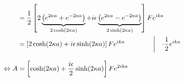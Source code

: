 {\begin{align}
              & = \frac{1}{2}\left[
                     2 
                     \underbrace{\left(e^{2\kappa a}+e^{-2\kappa a}\right)}
                     _{2\cosh(2\kappa a)}
                     +i\epsilon
                     \underbrace{\left(e^{2\kappa a}-e^{-2\kappa a}\right)}
                    _{2\sinh(2\kappa a)}\right]
                     Fe^{ika} \notag \\
              & = \left[2\cosh(2\kappa a) +i\epsilon\sinh(2\kappa a)\right]
                     Fe^{ika} \qquad \qquad \left|\quad \cdot
                       \frac{1}{2}e^{ika}\right.\notag\\[2ex]
\Leftrightarrow A & = \left[\cosh(2\kappa a) 
                     +\frac{i\epsilon}{2}\sinh(2\kappa a)\right]Fe^{2ika}
\end{align}
}

